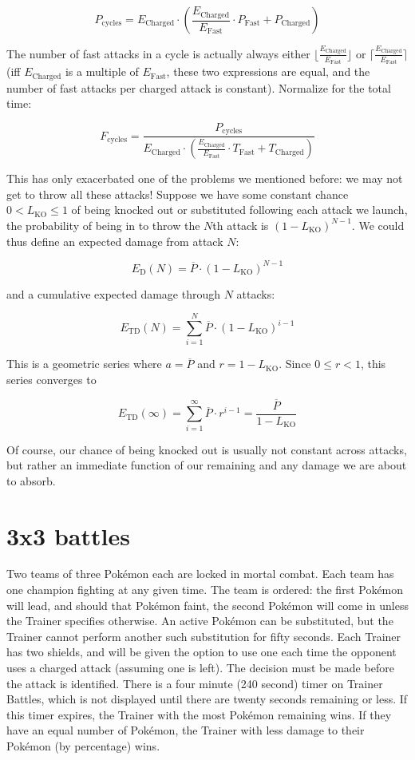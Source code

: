 \[ P_\mathrm{cycles} = E_\mathrm{Charged} \cdot \left(\frac{E_\mathrm{Charged}}{E_\mathrm{Fast}} \cdot P_\mathrm{Fast} + P_\mathrm{Charged}\right) \]

The number of fast attacks in a cycle is actually always either
 $\lfloor\frac{E_\mathrm{Charged}}{E_\mathrm{Fast}}\rfloor$
 or $\lceil\frac{E_\mathrm{Charged}}{E_\mathrm{Fast}}\rceil$ (iff $E_\mathrm{Charged}$ is a multiple of
 $E_\mathrm{Fast}$, these two expressions are equal, and the number of fast attacks
 per charged attack is constant). Normalize for the total time:

\[ F_\mathrm{cycles} = \frac{P_\mathrm{cycles}}{E_\mathrm{Charged} \cdot \left(\frac{E_\mathrm{Charged}}{E_\mathrm{Fast}} \cdot T_\mathrm{Fast} + T_\mathrm{Charged}\right)} \]

This has only exacerbated one of the problems we mentioned before: we may
  not get to throw all these attacks!
Suppose we have some constant chance $0 < L_\mathrm{KO} \leq 1$ of being knocked out or
 substituted following each attack we launch, the probability of being
 in to throw the $N$th attack is $(1 - L_\mathrm{KO})^{N-1}$.
We could thus define an expected damage from attack $N$:

\[ E_\mathrm{D}(N) = \overline{P} \cdot (1 - L_\mathrm{KO})^{N-1} \]

and a cumulative expected damage through $N$ attacks:

\[ E_\mathrm{TD}(N) = \sum^N_{i=1} \overline{P} \cdot (1 - L_\mathrm{KO})^{i-1} \]

This is a geometric series where $a = \overline{P}$ and $r = 1 - L_\mathrm{KO}$.
Since $0 \leq r < 1$, this series converges to

\[ E_\mathrm{TD}(\infty) = \sum^\infty_{i=1} \overline{P} \cdot r^{i-1} = \frac{\overline{P}}{1 - L_\mathrm{KO}} \]

Of course, our chance of being knocked out is usually not constant across
 attacks, but rather an immediate function of our remaining \HP{} and any
 damage we are about to absorb.

\section{3x3 battles\label{sec:3x3}}
Two teams of three Pokémon each are locked in mortal combat.
Each team has one champion fighting at any given time.
The team is ordered: the first Pokémon will lead, and should that Pokémon
  faint, the second Pokémon will come in unless the Trainer specifies otherwise.
An active Pokémon can be substituted, but the Trainer cannot perform another
  such substitution for fifty seconds.
Each Trainer has two shields, and will be given the option to use one each time
  the opponent uses a charged attack (assuming one is left).
The decision must be made before the attack is identified.
There is a four minute (240 second) timer on Trainer Battles, which is not displayed
  until there are twenty seconds remaining or less.
If this timer expires, the Trainer with the most Pokémon remaining wins.
If they have an equal number of Pokémon, the Trainer with less damage to their
  Pokémon (by percentage) wins.

